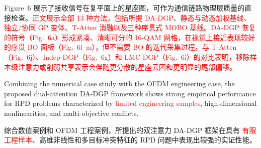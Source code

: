 \documentclass[11pt]{article}
\begin{document}
Figure~6 展示了接收信号在复平面上的星座图，可作为通信链路物理层质量的直接检查。\textcolor{red}{正文展示全部 13 种方法，包括所提 DA-DGP、静态与动态加权基线、独立/协同 GP 变体、T-Atten 消融以及三种序贯式 MOBO 基线。DA-DGP 恢复的符号（Fig.~6a）形成紧凑、清晰可分的 16-QAM 网格，在视觉上接近表现较好的序贯 BO 面板（Fig.~6l--m），但不需要 BO 的迭代采集过程。与 T-Atten（Fig.~6j）、Indep-DGP（Fig.~6g）和 LMC-DGP（Fig.~6i）的对比表明，移除样本级注意力或削弱共享表示会伴随更分散的星座云团和更明显的尾部偏移。}%

Combining the numerical case study with the OFDM engineering case, the proposed dual-attention DA-DGP framework shows strong empirical performance for RPD problems characterized by \textcolor{red}{limited engineering samples}, high-dimensional nonlinearities, and multi-objective conflicts.%

综合数值案例和 OFDM 工程案例，所提出的双注意力 DA-DGP 框架在具有 \textcolor{red}{有限工程样本}、高维非线性和多目标冲突特征的 RPD 问题中表现出较强的实证性能。%
\end{document}
